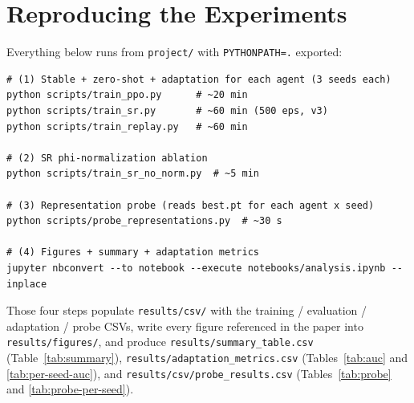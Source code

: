 \section{Reproducing the Experiments}
\label{app:reproduce}

Everything below runs from \texttt{project/} with \texttt{PYTHONPATH=.} exported:

\begin{verbatim}
# (1) Stable + zero-shot + adaptation for each agent (3 seeds each)
python scripts/train_ppo.py      # ~20 min
python scripts/train_sr.py       # ~60 min (500 eps, v3)
python scripts/train_replay.py   # ~60 min

# (2) SR phi-normalization ablation
python scripts/train_sr_no_norm.py  # ~5 min

# (3) Representation probe (reads best.pt for each agent x seed)
python scripts/probe_representations.py  # ~30 s

# (4) Figures + summary + adaptation metrics
jupyter nbconvert --to notebook --execute notebooks/analysis.ipynb --inplace
\end{verbatim}

Those four steps populate \texttt{results/csv/} with the training / evaluation / adaptation / probe CSVs, write every figure referenced in the paper into \texttt{results/figures/}, and produce \texttt{results/summary\_table.csv} (Table~\ref{tab:summary}), \texttt{results/adaptation\_metrics.csv} (Tables~\ref{tab:auc} and \ref{tab:per-seed-auc}), and \texttt{results/csv/probe\_results.csv} (Tables~\ref{tab:probe} and \ref{tab:probe-per-seed}).
